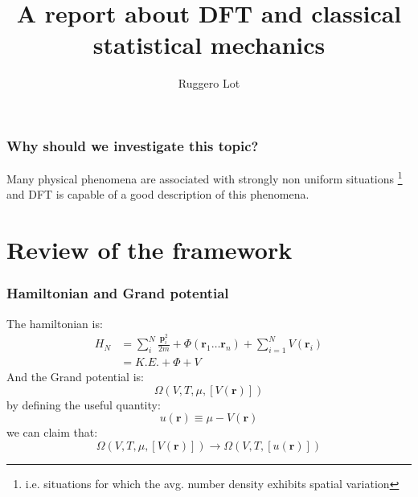 \documentclass[12pt,notes=off,unicode]{beamer}
\title{A report about DFT and classical statistical mechanics}
\author[Ruggero]{Ruggero Lot}
\institute[UNITS]{Università degli studi di Trieste}
\begin{document}
  \begin{frame}\frametitle{}
    \maketitle
  \end{frame}

  \begin{frame}[c]\frametitle{Why should we investigate this topic?}
      
    Many physical phenomena are associated with strongly non uniform situations \footnote{i.e. situations for which the avg. number density exhibits spatial variation} and DFT is capable of a good description of this phenomena.
  
  \end{frame}

  
  \section{Review of the framework} %
  \label{sec:review_of_the_framework}
  \begin{frame}[c]\frametitle{Hamiltonian and Grand potential}
    The hamiltonian is:
    \begin{equation}
      \begin{split}
      H_N &= \sum_i^N \frac{\mathbf{p}_i^2}{2 m} + \Phi(\mathbf{r}_1\dots \mathbf{r}_n) + \sum_{i=1}^N V(\mathbf{r}_i)\\
       &= K.E. + \Phi +V
      \end{split}
    \end{equation}
    And the Grand potential is:
    \begin{equation*}
      \Omega(V, T, \mu,[V(\mathbf{r})]) 
    \end{equation*}
    by defining the useful quantity:
    \begin{equation}
      u(\mathbf{r})\equiv\mu - V(\mathbf{r})
    \end{equation}
    we can claim that:
    \begin{equation}
       \Omega(V, T, \mu,[V(\mathbf{r})]) \rightarrow \Omega(V, T, [u(\mathbf{r})])
    \end{equation}
  \end{frame}
\end{document}
